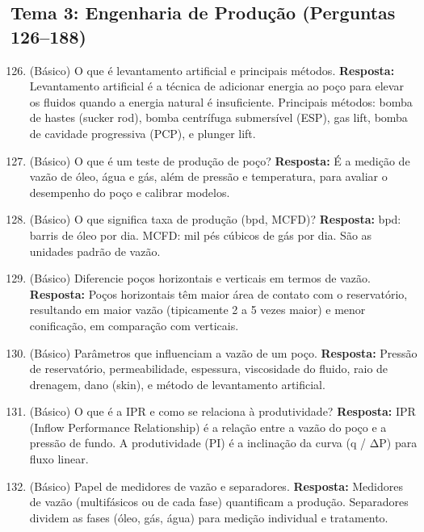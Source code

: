 \documentclass[11pt,a4paper]{article}
\begin{document}
\newpage

\subsection*{Tema 3: Engenharia de Produção (Perguntas 126–188)}

\begin{enumerate}
  \setcounter{enumi}{125}
  \item (Básico) O que é levantamento artificial e principais métodos.
  \textbf{Resposta:} Levantamento artificial é a técnica de adicionar energia ao poço para elevar os fluidos quando a energia natural é insuficiente. Principais métodos: bomba de hastes (sucker rod), bomba centrífuga submersível (ESP), gas lift, bomba de cavidade progressiva (PCP), e plunger lift.

  \item (Básico) O que é um teste de produção de poço?
  \textbf{Resposta:} É a medição de vazão de óleo, água e gás, além de pressão e temperatura, para avaliar o desempenho do poço e calibrar modelos.

  \item (Básico) O que significa taxa de produção (bpd, MCFD)?
  \textbf{Resposta:} bpd: barris de óleo por dia. MCFD: mil pés cúbicos de gás por dia. São as unidades padrão de vazão.

  \item (Básico) Diferencie poços horizontais e verticais em termos de vazão.
  \textbf{Resposta:} Poços horizontais têm maior área de contato com o reservatório, resultando em maior vazão (tipicamente 2 a 5 vezes maior) e menor conificação, em comparação com verticais.

  \item (Básico) Parâmetros que influenciam a vazão de um poço.
  \textbf{Resposta:} Pressão de reservatório, permeabilidade, espessura, viscosidade do fluido, raio de drenagem, dano (skin), e método de levantamento artificial.

  \item (Básico) O que é a IPR e como se relaciona à produtividade?
  \textbf{Resposta:} IPR (Inflow Performance Relationship) é a relação entre a vazão do poço e a pressão de fundo. A produtividade (PI) é a inclinação da curva (q / ΔP) para fluxo linear.

  \item (Básico) Papel de medidores de vazão e separadores.
  \textbf{Resposta:} Medidores de vazão (multifásicos ou de cada fase) quantificam a produção. Separadores dividem as fases (óleo, gás, água) para medição individual e tratamento.


\end{enumerate}
\end{document}
